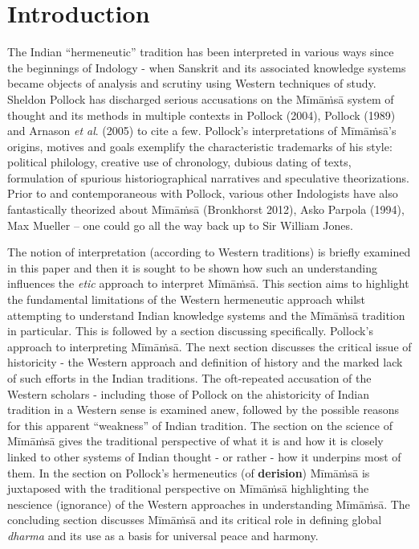\section*{Introduction}

The Indian “hermeneutic” tradition has been interpreted in various ways since the beginnings of Indology - when Sanskrit and its associated knowledge systems became objects of analysis and scrutiny using Western techniques of study. Sheldon Pollock has discharged serious accusations on the Mīmāṁsā system of thought and its methods in multiple contexts in Pollock (2004), Pollock (1989) and Arnason \textit{et al}. (2005) to cite a few. Pollock’s interpretations of Mīmāṁsā’s origins, motives and goals exemplify the characteristic trademarks of his style: political philology, creative use of chronology, dubious dating of texts, formulation of spurious historiographical narratives and speculative theorizations. Prior to and contemporaneous with Pollock, various other Indologists have also fantastically theorized about Mīmāṁsā (Bronkhorst 2012), Asko Parpola (1994), Max Mueller – one could go all the way back up to Sir William Jones.

The notion of interpretation (according to Western traditions) is briefly examined in this paper and then it is sought to be shown how such an understanding influences the \textit{etic} approach to interpret Mīmāṁsā. This section aims to highlight the fundamental limitations of the Western hermeneutic approach whilst attempting to understand Indian knowledge systems and the Mīmāṁsā tradition in particular. This is followed by a section discussing specifically. Pollock’s approach to interpreting Mīmāṁsā. The next section discusses the critical issue of historicity - the Western approach and definition of history and the marked lack of such efforts in the Indian traditions. The oft-repeated accusation of the Western scholars - including those of Pollock on the ahistoricity of Indian tradition in a Western sense is examined anew, followed by the possible reasons for this apparent “weakness” of Indian tradition. The section on the science of Mīmāṁsā gives the traditional perspective of what it is and how it is closely linked to other systems of Indian thought - or rather - how it underpins most of them. In the section on Pollock’s hermeneutics (of \textbf{derision}) Mīmāṁsā is juxtaposed with the traditional perspective on Mīmāṁsā highlighting the nescience (ignorance) of the Western approaches in understanding Mīmāṁsā. The concluding section discusses Mīmāṁsā and its critical role in defining global \textit{dharma} and its use as a basis for universal peace and harmony.


